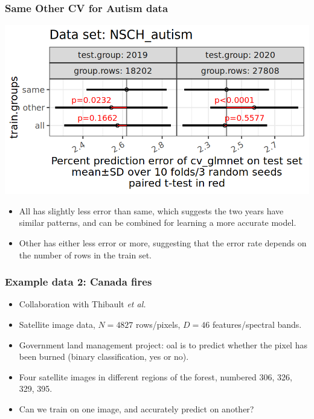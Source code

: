 \documentclass{beamer}
\begin{document}
\begin{frame}
  \frametitle{Same Other CV for Autism data}
  \includegraphics[width=\textwidth]{NSCH_autism_error_glmnet_sizes_mean_SD_pvalue.png}
  
  \vskip -0.4cm
  
  \begin{itemize}
  \item All has slightly less error than same, which suggests the
    two years have similar patterns, and can be combined for learning
    a more accurate model.
  \item Other has either less error or more, suggesting that the error
    rate depends on the number of rows in the train set.
  \end{itemize}
\end{frame}

\begin{frame}
  \frametitle{Example data 2: Canada fires}
  \begin{itemize}
  \item Collaboration with Thibault \emph{et al.}
  \item Satellite image data, $N=4827$ rows/pixels, $D=46$
    features/spectral bands.
  \item Government land management project: oal is to predict whether
    the pixel has been burned (binary classification, yes or no).
  \item Four satellite images in different regions of the forest,
    numbered 306, 326, 329, 395.
  \item Can we train on one image, and accurately predict on another?
  \end{itemize}
\end{frame}
\end{document}
